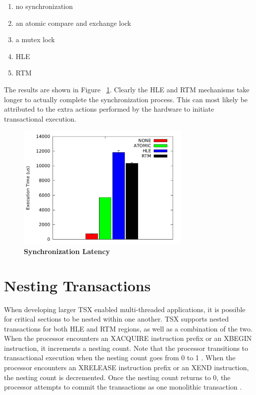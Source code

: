 \documentclass[11pt]{book}
\begin{document}
\begin{enumerate}
  \item no synchronization 
  \item an atomic compare and exchange lock
  \item a mutex lock
  \item HLE
  \item RTM
\end{enumerate}

The results are shown in Figure ~\ref{fig:tsx_latency}.  Clearly the HLE and RTM
mechanisms take longer to actually complete the synchronization process.  This can most
likely be attributed to the extra actions performed by the hardware to initiate
transactional execution.

\begin{figure}[H]
    \centering
    \graphicspath{ {./figures/} }
    \includegraphics[width=0.75\textwidth,keepaspectratio]{SyncBM}
    \caption{\textbf{Synchronization Latency}}
    \label{fig:tsx_latency}
\end{figure}

\section{Nesting Transactions}

When developing larger TSX enabled multi-threaded applications, it is possible for
critical sections to be nested within one another.  TSX supports nested transactions for
both HLE and RTM regions, as well as a combination of the two.  When the processor
encounters an XACQUIRE instruction prefix or an XBEGIN instruction, it increments a
nesting count.  Note that the processor transitions to transactional execution when the
nesting count goes from 0 to 1 \cite{intel_prog_ref}.  When the processor encounters an
XRELEASE instruction prefix or an XEND instruction, the nesting count is decremented.
Once the nesting count returns to 0, the processor attempts to commit the transactions as
one monolithic transaction \cite{intel_prog_ref}.
\end{document}
